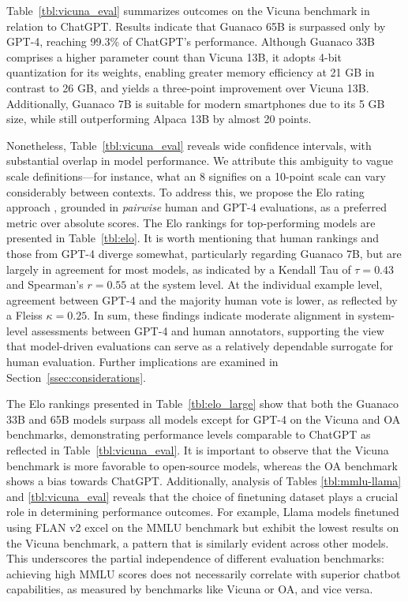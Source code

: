Table~\ref{tbl:vicuna_eval} summarizes outcomes on the Vicuna benchmark \cite{vicuna2023} in relation to ChatGPT. Results indicate that {Guanaco} 65B is surpassed only by GPT-4, reaching 99.3\% of ChatGPT’s performance. Although {Guanaco} 33B comprises a higher parameter count than Vicuna 13B, it adopts 4-bit quantization for its weights, enabling greater memory efficiency at 21 GB in contrast to 26 GB, and yields a three-point improvement over Vicuna 13B. Additionally, {Guanaco} 7B is suitable for modern smartphones due to its 5 GB size, while still outperforming Alpaca 13B by almost 20 points.

Nonetheless, Table~\ref{tbl:vicuna_eval} reveals wide confidence intervals, with substantial overlap in model performance. We attribute this ambiguity to vague scale definitions—for instance, what an 8 signifies on a 10-point scale can vary considerably between contexts. To address this, we propose the Elo rating approach \citep{elo1967proposed}, grounded in \textit{pairwise} human and GPT-4 evaluations, as a preferred metric over absolute scores. The Elo rankings for top-performing models are presented in Table~\ref{tbl:elo}. It is worth mentioning that human rankings and those from GPT-4 diverge somewhat, particularly regarding Guanaco 7B, but are largely in agreement for most models, as indicated by a Kendall Tau of $\tau=0.43$ and Spearman's $r=0.55$ at the system level. At the individual example level, agreement between GPT-4 and the majority human vote is lower, as reflected by a Fleiss $\kappa=0.25$. In sum, these findings indicate moderate alignment in system-level assessments between GPT-4 and human annotators, supporting the view that model-driven evaluations can serve as a relatively dependable surrogate for human evaluation. Further implications are examined in Section~\ref{ssec:considerations}.

The Elo rankings presented in Table~\ref{tbl:elo_large} show that both the {Guanaco} 33B and 65B models surpass all models except for GPT-4 on the Vicuna and OA benchmarks, demonstrating performance levels comparable to ChatGPT as reflected in Table~\ref{tbl:vicuna_eval}. It is important to observe that the Vicuna benchmark is more favorable to open-source models, whereas the OA benchmark shows a bias towards ChatGPT. Additionally, analysis of Tables \ref{tbl:mmlu-llama} and \ref{tbl:vicuna_eval} reveals that the choice of finetuning dataset plays a crucial role in determining performance outcomes. For example, Llama models finetuned using FLAN v2 excel on the MMLU benchmark but exhibit the lowest results on the Vicuna benchmark, a pattern that is similarly evident across other models. This underscores the partial independence of different evaluation benchmarks: achieving high MMLU scores does not necessarily correlate with superior chatbot capabilities, as measured by benchmarks like Vicuna or OA, and vice versa.

